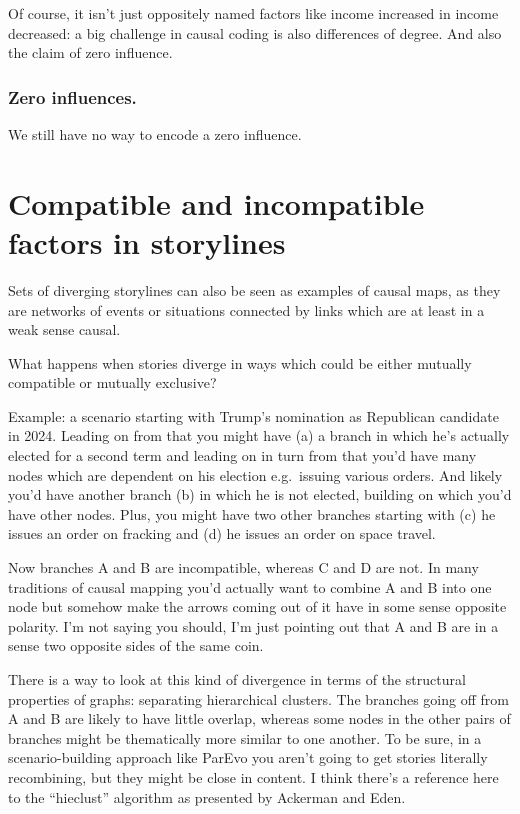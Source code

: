 \documentclass[
]{book}
\begin{document}
Of course, it isn't just oppositely named factors like income increased in income decreased: a big challenge in causal coding is also differences of degree. And also the claim of zero influence.

\hypertarget{zero-influences.}{%
\subsection{Zero influences.}\label{zero-influences.}}

We still have no way to encode a zero influence.

\hypertarget{compatible-and-incompatible-factors-in-storylines}{%
\chapter{Compatible and incompatible factors in storylines}\label{compatible-and-incompatible-factors-in-storylines}}

Sets of diverging storylines can also be seen as examples of causal maps, as they are networks of events or situations connected by links which are at least in a weak sense causal.

What happens when stories diverge in ways which could be either mutually compatible or mutually exclusive?

Example: a scenario starting with Trump's nomination as Republican candidate in 2024. Leading on from that you might have (a) a branch in which he's actually elected for a second term and leading on in turn from that you'd have many nodes which are dependent on his election e.g.~issuing various orders. And likely you'd have another branch (b) in which he is not elected, building on which you'd have other nodes. Plus, you might have two other branches starting with (c) he issues an order on fracking and (d) he issues an order on space travel.

Now branches A and B are incompatible, whereas C and D are not. In many traditions of causal mapping you'd actually want to combine A and B into one node but somehow make the arrows coming out of it have in some sense opposite polarity. I'm not saying you should, I'm just pointing out that A and B are in a sense two opposite sides of the same coin.

There is a way to look at this kind of divergence in terms of the structural properties of graphs: separating hierarchical clusters. The branches going off from A and B are likely to have little overlap, whereas some nodes in the other pairs of branches might be thematically more similar to one another. To be sure, in a scenario-building approach like ParEvo you aren't going to get stories literally recombining, but they might be close in content. I think there's a reference here to the ``hieclust'' algorithm as presented by Ackerman and Eden.
\end{document}
